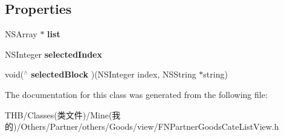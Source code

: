 \subsection*{Properties}
\begin{DoxyCompactItemize}
\item 
\mbox{\label{interface_f_n_partner_goods_cate_list_view_a615816f9342a89ec6a38e7abf6adcab6}} 
N\+S\+Array $\ast$ {\bfseries list}
\item 
\mbox{\label{interface_f_n_partner_goods_cate_list_view_a3a71da5fd9397f8c64b13958da227684}} 
N\+S\+Integer {\bfseries selected\+Index}
\item 
\mbox{\label{interface_f_n_partner_goods_cate_list_view_a0d43fa8a5f87115ab1c871d403c19cc9}} 
void($^\wedge$ {\bfseries selected\+Block} )(N\+S\+Integer index, N\+S\+String $\ast$string)
\end{DoxyCompactItemize}


The documentation for this class was generated from the following file\+:\begin{DoxyCompactItemize}
\item 
T\+H\+B/\+Classes(类文件)/\+Mine(我的)/\+Others/\+Partner/others/\+Goods/view/F\+N\+Partner\+Goods\+Cate\+List\+View.\+h\end{DoxyCompactItemize}
